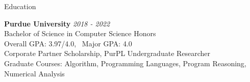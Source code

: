\documentclass{resume} %
\begin{document}

\begin{rSection}{Education}

{\bf Purdue University} \hfill {\em 2018 - 2022} \\ 
Bachelor of Science in Computer Science Honors \smallskip \\
Overall GPA: 3.97/4.0, \ Major GPA: 4.0\\
Corporate Partner Scholarship, PurPL Undergraduate Researcher\\
Graduate Courses: Algorithm, Programming Languages,
Program Reasoning, Numerical Analysis

\end{rSection}

\end{document}

